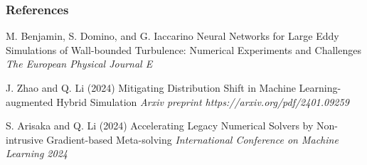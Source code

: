 \documentclass[paper slide]{beamer}
\begin{document}
\begin{frame} %
    \frametitle{References}
 
    \begin{thebibliography}{99} %
        \footnotesize %
 
		M. Benjamin, S. Domino, and G. Iaccarino
		\newblock Neural Networks for Large Eddy Simulations of Wall-bounded Turbulence: Numerical Experiments and Challenges
		\newblock \emph{The European Physical Journal E}

        J. Zhao and Q. Li (2024)
        \newblock Mitigating Distribution Shift in Machine Learning-augmented Hybrid Simulation
        \newblock \emph{Arxiv preprint https://arxiv.org/pdf/2401.09259}

        S. Arisaka and Q. Li (2024)
        \newblock Accelerating Legacy Numerical Solvers by Non-intrusive Gradient-based Meta-solving
        \newblock \emph{International Conference on Machine Learning 2024}
 
        
    \end{thebibliography}
\end{frame}
\end{document}
